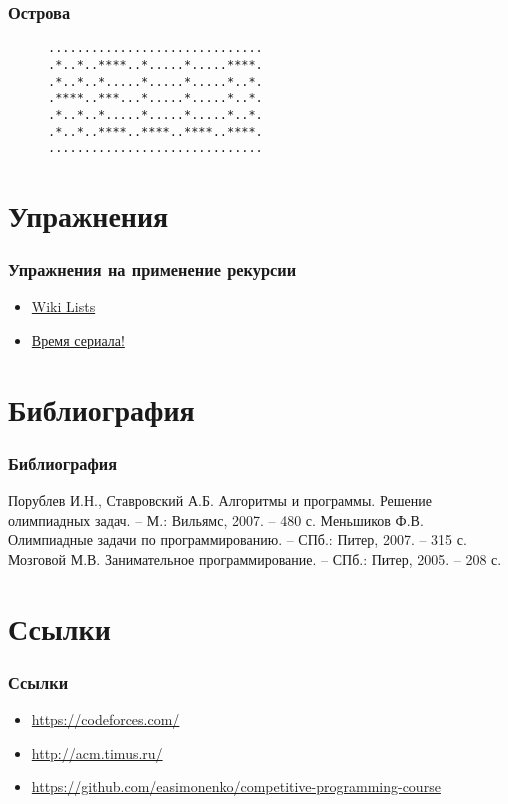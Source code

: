 \documentclass[11pt]{beamer}
\begin{document}
\begin{frame}
\frametitle{Острова}
\begin{figure}[h]
\center
\begin{alltt}
.............................. \\
.*..*..****..*.....*.....****. \\
.*..*..*.....*.....*.....*..*. \\
.****..***...*.....*.....*..*. \\
.*..*..*.....*.....*.....*..*. \\
.*..*..****..****..****..****. \\
..............................
\end{alltt}

\end{figure}
\end{frame}

\section{Упражнения}

\begin{frame}
\frametitle{Упражнения на применение рекурсии}
\begin{itemize}
	\item \href{https://codeforces.com/problemsets/acmsguru/problem/99999/461}{Wiki Lists}
	\item \href{https://codeforces.com/contest/60/problem/B}{Время сериала!}
\end{itemize}
\end{frame}

\section{Библиография}

\begin{frame}
\frametitle{Библиография}
\begin{thebibliography}{1}
   Порублев И.Н., Ставровский А.Б. Алгоритмы и программы.
  Решение олимпиадных задач. -- М.: Вильямс, 2007. -- 480 с.
   Меньшиков Ф.В. Олимпиадные задачи по программированию. -- СПб.: Питер,
  2007. -- 315 с.
   Мозговой М.В. Занимательное программирование. -- СПб.: Питер, 2005. -- 208 с.
\end{thebibliography}
\end{frame}

\section{Ссылки}

\begin{frame}
\frametitle{Ссылки}
\begin{itemize}
	\item \url{https://codeforces.com/}
	\item \url{http://acm.timus.ru/}
	\item \url{https://github.com/easimonenko/competitive-programming-course}
\end{itemize}
\end{frame}
\end{document}
